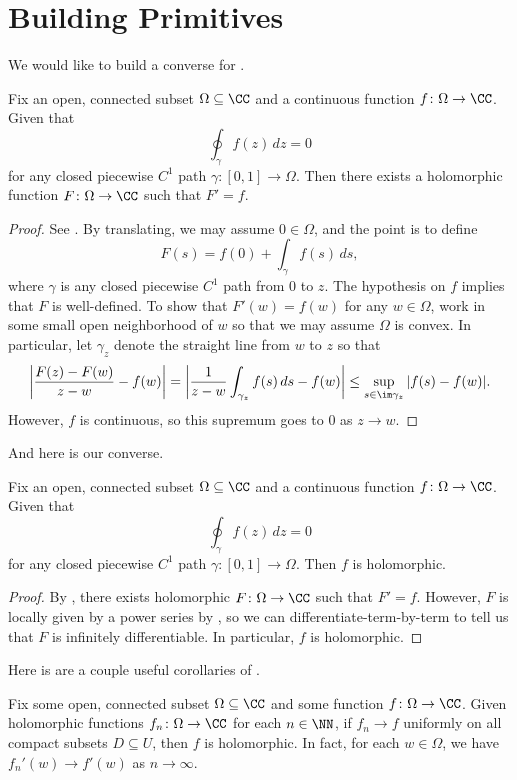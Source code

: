 \documentclass[notes.tex]{subfiles}
\begin{document}
\section{Building Primitives}
We would like to build a converse for .
\begin{proposition} \label{prop:build-primitive}
	Fix an open, connected subset $\Omega\subseteq\CC$ and a continuous function $f\colon\Omega\to\CC$. Given that
	\[\oint_\gamma f(z)\,dz=0\]
	for any closed piecewise $C^1$ path $\gamma\colon[0,1]\to\Omega$. Then there exists a holomorphic function $F\colon\Omega\to\CC$ such that $F'=f$.
\end{proposition}
\begin{proof}
	See \cite[Theorem~4.44]{nir-complex-analysis}. By translating, we may assume $0\in\Omega$, and the point is to define
	\[F(s)=f(0)+\int_\gamma f(s)\,ds,\]
	where $\gamma$ is any closed piecewise $C^1$ path from $0$ to $z$. The hypothesis on $f$ implies that $F$ is well-defined. To show that $F'(w)=f(w)$ for any $w\in\Omega$, work in some small open neighborhood of $w$ so that we may assume $\Omega$ is convex. In particular, let $\gamma_z$ denote the straight line from $w$ to $z$ so that
	\[\left|\frac{F(z)-F(w)}{z-w}-f(w)\right|=\left|\frac1{z-w}\int_{\gamma_z}f(s)\,ds-f(w)\right|\le\sup_{s\in\im\gamma_z}|f(s)-f(w)|.\]
	However, $f$ is continuous, so this supremum goes to $0$ as $z\to w$.
\end{proof}
And here is our converse.
\begin{theorem}[Morera] \label{thm:morera}
	Fix an open, connected subset $\Omega\subseteq\CC$ and a continuous function $f\colon\Omega\to\CC$. Given that
	\[\oint_\gamma f(z)\,dz=0\]
	for any closed piecewise $C^1$ path $\gamma\colon[0,1]\to\Omega$. Then $f$ is holomorphic.
\end{theorem}
\begin{proof}
	By , there exists holomorphic $F\colon\Omega\to\CC$ such that $F'=f$. However, $F$ is locally given by a power series by , so we can differentiate-term-by-term to tell us that $F$ is infinitely differentiable. In particular, $f$ is holomorphic.
\end{proof}
Here is are a couple useful corollaries of .
\begin{lemma} \label{lem:holo-limit}
	Fix some open, connected subset $\Omega\subseteq\CC$ and some function $f\colon\Omega\to\CC$. Given holomorphic functions $f_n\colon\Omega\to\CC$ for each $n\in\NN$, if $f_n\to f$ uniformly on all compact subsets $D\subseteq U$, then $f$ is holomorphic. In fact, for each $w\in\Omega$, we have $f_n'(w)\to f'(w)$ as $n\to\infty$.
\end{lemma}
\end{document}
